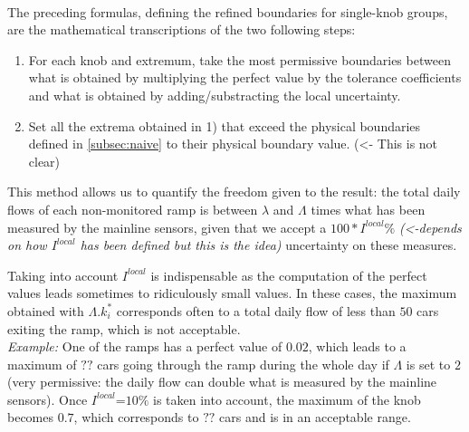 \\
The preceding formulas, defining the refined boundaries for single-knob groups, are the mathematical transcriptions of the two following steps:
\begin{enumerate}
	\item For each knob and extremum, take the most permissive boundaries between what is obtained by multiplying the perfect value by the tolerance coefficients and what is obtained by adding/substracting the local uncertainty.
	\item Set all the extrema obtained in 1) that exceed the physical boundaries defined in \ref{subsec:naive} to their physical boundary value. \color{red}(<- This is not clear)\color{black}
\end{enumerate}

This method allows us to quantify the freedom given to the result: the total daily flows of each non-monitored ramp is between $\lambda$ and $\Lambda$ times what has been measured by the mainline sensors, given that we accept a $100*I^{local}\%$ \color{red}\emph{(<-depends on how $I^{local}$ has been defined but this is the idea)}\color{black} uncertainty on these measures.

Taking into account $I^{local}$ is indispensable as the computation of the perfect values leads sometimes to ridiculously small values. In these cases, the maximum obtained with $\Lambda.k_{i}^{*}$ corresponds often to a total daily flow of less than $50$ cars exiting the ramp, which is not acceptable.\\ 
\emph{Example: } One of the ramps has a perfect value of $0.02$, which leads to a maximum of $??$ cars going through the ramp during the whole day if $\Lambda$ is set to $2$ (very permissive: the daily flow can double what is measured by the mainline sensors). Once $I^{local}$=$10\%$ is taken into account, the maximum of the knob becomes $0.7$, which corresponds to $??$ cars and is in an acceptable range.\\
